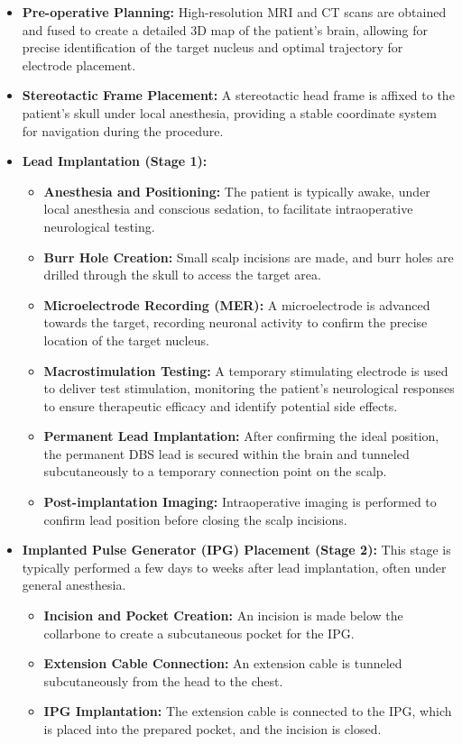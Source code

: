 \begin{itemize}
  \item \textbf{Pre-operative Planning:} High-resolution MRI and CT scans are obtained and fused to create a detailed 3D map of the patient's brain, allowing for precise identification of the target nucleus and optimal trajectory for electrode placement.

  \item \textbf{Stereotactic Frame Placement:} A stereotactic head frame is affixed to the patient's skull under local anesthesia, providing a stable coordinate system for navigation during the procedure.

  \item \textbf{Lead Implantation (Stage 1):}
    \begin{itemize}
      \item \textbf{Anesthesia and Positioning:} The patient is typically awake, under local anesthesia and conscious sedation, to facilitate intraoperative neurological testing.
      \item \textbf{Burr Hole Creation:} Small scalp incisions are made, and burr holes are drilled through the skull to access the target area.
      \item \textbf{Microelectrode Recording (MER):} A microelectrode is advanced towards the target, recording neuronal activity to confirm the precise location of the target nucleus.
      \item \textbf{Macrostimulation Testing:} A temporary stimulating electrode is used to deliver test stimulation, monitoring the patient's neurological responses to ensure therapeutic efficacy and identify potential side effects.
      \item \textbf{Permanent Lead Implantation:} After confirming the ideal position, the permanent DBS lead is secured within the brain and tunneled subcutaneously to a temporary connection point on the scalp.
      \item \textbf{Post-implantation Imaging:} Intraoperative imaging is performed to confirm lead position before closing the scalp incisions.
    \end{itemize}

  \item \textbf{Implanted Pulse Generator (IPG) Placement (Stage 2):} This stage is typically performed a few days to weeks after lead implantation, often under general anesthesia.
    \begin{itemize}
      \item \textbf{Incision and Pocket Creation:} An incision is made below the collarbone to create a subcutaneous pocket for the IPG.
      \item \textbf{Extension Cable Connection:} An extension cable is tunneled subcutaneously from the head to the chest.
      \item \textbf{IPG Implantation:} The extension cable is connected to the IPG, which is placed into the prepared pocket, and the incision is closed.
    \end{itemize}


\end{itemize}
